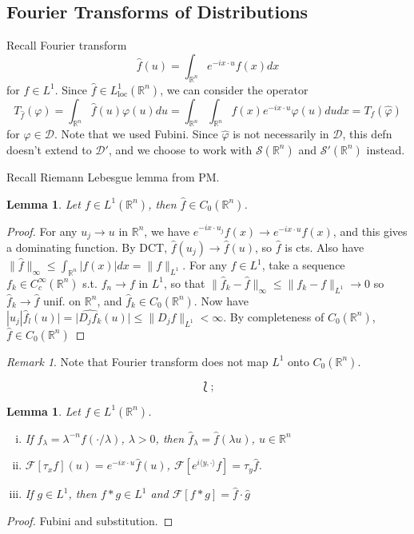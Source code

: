 \documentclass{article}
\theoremstyle{definition}
\theoremstyle{remark}
\newtheorem{rem}{Remark}
\theoremstyle{plain}
\newtheorem{lem}[defn]{Lemma}
\newcommand{\RR}{\mathbb{R}}
\newcommand{\calD}{\mathcal{D}}
\begin{document}
\subsection{Fourier Transforms of Distributions}
Recall Fourier transform \[\hat f(u)=\int_{\RR^n}e^{-ix\cdot u}f(x)dx\]
for $f\in L^1$. Since $\hat f\in L^1_{\text{loc}}(\RR^n)$, we can consider the operator
\[T_{\hat f}(\varphi)=\int_{\RR^n}\hat f(u)\varphi(u)du=\int_{\RR^n}\int_{\RR^n}f(x)e^{-ix\cdot u}\varphi(u)dudx=T_f(\hat\varphi)\] for $\varphi\in\calD$. Note that we used Fubini.
Since $\hat\varphi$ is not necessarily in $\calD$, this defn doesn't extend to $\calD'$, and we choose to work with $\mathcal S(\RR^n)$ and $\mathcal S'(\RR^n)$ instead.

Recall Riemann Lebesgue lemma from PM.
\begin{lem}
    Let $f\in L^1(\RR^n)$, then $\hat f\in C_0(\RR^n)$.
\end{lem}
\begin{proof}
    For any $u_j\to u$ in $\RR^n$, we have $e^{-ix\cdot u_j}f(x)\to e^{-ix\cdot u}f(x)$, and this gives a dominating function. By DCT, $\hat f(u_j)\to \hat f(u)$, so $\hat f$ is cts.
    Also have $\|\hat f\|_\infty\le \int_{\RR^n}|f(x)|dx=\|f\|_{L^1}$. For any $f\in L^1$, take a sequence $f_k\in C^\infty_c(\RR^n)$ s.t. $f_n\to f$ in $L^1$, so that $\|\hat f_k-\hat f\|_\infty\le \|f_k-f\|_{L^1}\to 0$ so $\hat f_k\to \hat f$ unif. on $\RR^n$, and $\hat f_k\in C_0(\RR^n)$. Now have $|u_j|\hat f_l(u)|=|\hat{D_jf_k}(u)|\le \|D_jf\|_{L^1}<\infty$. By completeness of $C_0(\RR^n)$, $\hat f\in C_0(\RR^n)$
\end{proof}
\begin{rem}
    Note that Fourier transform does not map $L^1$ onto $C_0(\RR^n)$.
\end{rem}
\[\Lbag;\tag{Owen's signature}\]
\begin{lem}
    Let $f\in L^1(\RR^n)$.\begin{enumerate}[(i)]
        \item If $f_\lambda=\lambda^{-n}f(\cdot/\lambda)$, $\lambda>0$, then $\hat f_\lambda=\hat{f}(\lambda u)$, $u\in\RR^n$
        \item $\mathcal F[\tau_x f](u)=e^{-ix\cdot u}\hat f(u)$, $\mathcal F[e^{i\langle y,\cdot\rangle}f]=\tau_y \hat f$.
        \item If $g\in L^1$, then $f\ast g\in L^1$ and $\mathcal F[f\ast g]=\hat f\cdot \hat g$
    \end{enumerate}
\end{lem}
\begin{proof}
    Fubini and substitution.
\end{proof}
\end{document}
